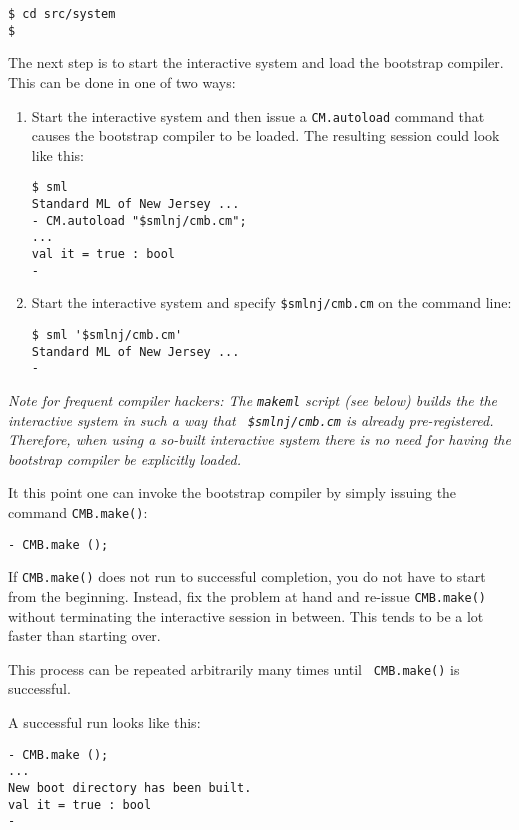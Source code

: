 \begin{verbatim}
$ cd src/system
$
\end{verbatim}

The next step is to start the interactive system and load the
bootstrap compiler.  This can be done in one of two ways:

\begin{enumerate}
\item Start the interactive system and then issue a {\tt CM.autoload}
command that causes the bootstrap compiler to be loaded. The resulting
session could look like this:
\begin{verbatim}
$ sml
Standard ML of New Jersey ...
- CM.autoload "$smlnj/cmb.cm";
...
val it = true : bool
-
\end{verbatim}
\item Start the interactive system and specify {\tt \$smlnj/cmb.cm} on
the command line:
\begin{verbatim}
$ sml '$smlnj/cmb.cm'
Standard ML of New Jersey ...
-  
\end{verbatim}
\end{enumerate}

{\it Note for frequent compiler hackers:  The {\tt makeml} script (see
below) builds the the interactive system in such a way that {\tt
\$smlnj/cmb.cm} is already pre-registered.  Therefore, when using a
so-built interactive system there is no need for having the bootstrap
compiler be explicitly loaded.}

It this point one can invoke the bootstrap compiler by simply issuing
the command {\tt CMB.make()}:

\begin{verbatim}
- CMB.make ();
\end{verbatim}

If {\tt CMB.make()} does not run to successful completion, you do not
have to start from the beginning.  Instead, fix the problem at hand
and re-issue {\tt CMB.make()} without terminating the interactive
session in between.  This tends to be a lot faster than starting over.

This process can be repeated arbitrarily many times until {\tt
CMB.make()} is successful.

A successful run looks like this:

\begin{verbatim}
- CMB.make ();
...
New boot directory has been built.
val it = true : bool
- 
\end{verbatim}

